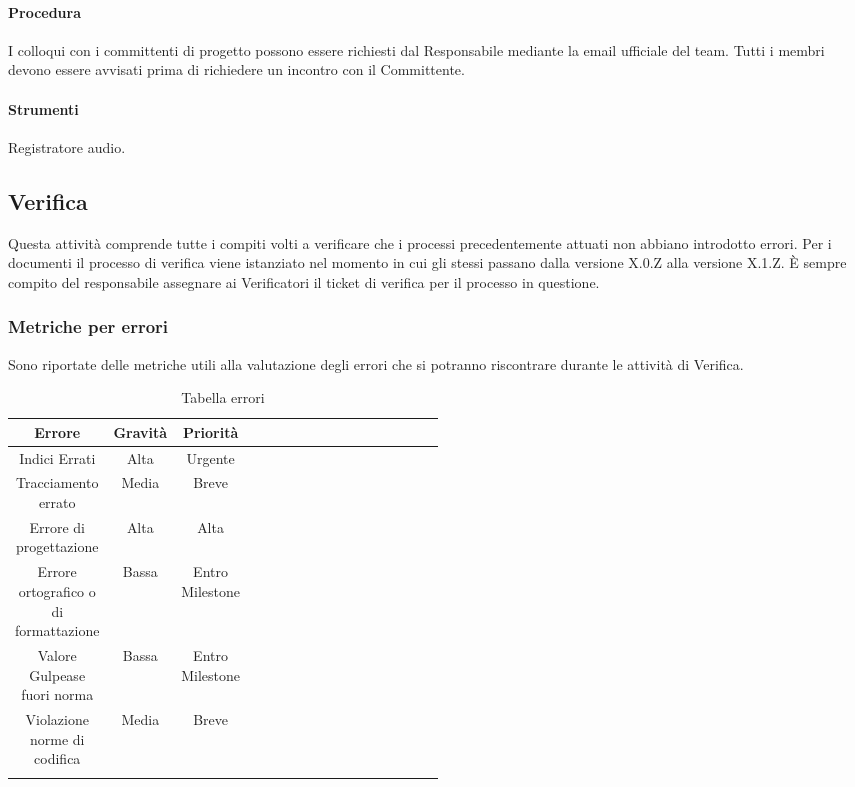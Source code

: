 \paragraph{Procedura}
I colloqui con i committenti di progetto possono essere richiesti dal Responsabile mediante la email ufficiale del team. Tutti i membri devono essere avvisati prima di richiedere un incontro con il Committente.

\paragraph{Strumenti}
Registratore audio.

\subsection{Verifica}
Questa attivit\`{a} comprende tutte i compiti volti a verificare che i processi precedentemente attuati non abbiano introdotto errori.
Per i documenti il processo di verifica viene istanziato nel momento in cui gli stessi passano dalla versione X.0.Z alla versione X.1.Z. 
È sempre compito del responsabile assegnare ai Verificatori il ticket di verifica per il processo in questione.

\subsubsection{Metriche per errori}
Sono riportate delle metriche utili alla valutazione degli errori che si potranno riscontrare durante le attivit\`{a} di Verifica.
\begin{center}
\begin{longtable}{|c|c|c|p{0.5\linewidth}|}
\toprule
\textbf{Errore} & \textbf{Gravità} & \textbf{Priorità} \\

\midrule
Indici Errati & Alta & Urgente\\
\midrule
Tracciamento errato & Media & Breve\\
\midrule
Errore di progettazione & Alta & Alta\\
\midrule
Errore ortografico o di formattazione & Bassa & Entro Milestone\\
\midrule
Valore Gulpease fuori norma & Bassa & Entro Milestone\\
\midrule
Violazione norme di codifica & Media & Breve\\

\bottomrule
\caption{Tabella errori}
\label{tab:changelog}
\end{longtable}
\end{center}

